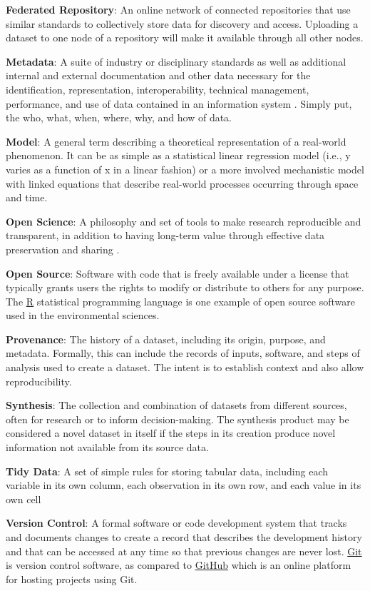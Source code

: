 \documentclass[
]{book}
\begin{document}
\textbf{Federated Repository}: An online network of connected repositories that use similar standards to collectively store data for discovery and access. Uploading a dataset to one node of a repository will make it available through all other nodes.

\textbf{Metadata}: A suite of industry or disciplinary standards as well as additional internal and external documentation and other data necessary for the identification, representation, interoperability, technical management, performance, and use of data contained in an information system \citep{Gilliland16}. Simply put, the who, what, when, where, why, and how of data.

\textbf{Model}: A general term describing a theoretical representation of a real-world phenomenon. It can be as simple as a statistical linear regression model (i.e., y varies as a function of x in a linear fashion) or a more involved mechanistic model with linked equations that describe real-world processes occurring through space and time.

\textbf{Open Science}: A philosophy and set of tools to make research reproducible and transparent, in addition to having long-term value through effective data preservation and sharing \citep{Beck20}.

\textbf{Open Source}: Software with code that is freely available under a license that typically grants users the rights to modify or distribute to others for any purpose. The \href{https://cran.r-project.org/}{R} statistical programming language is one example of open source software used in the environmental sciences.

\textbf{Provenance}: The history of a dataset, including its origin, purpose, and metadata. Formally, this can include the records of inputs, software, and steps of analysis used to create a dataset. The intent is to establish context and also allow reproducibility.

\textbf{Synthesis}: The collection and combination of datasets from different sources, often for research or to inform decision-making. The synthesis product may be considered a novel dataset in itself if the steps in its creation produce novel information not available from its source data.

\textbf{Tidy Data}: A set of simple rules for storing tabular data, including each variable in its own column, each observation in its own row, and each value in its own cell \citep{Wickham14c}

\textbf{Version Control}: A formal software or code development system that tracks and documents changes to create a record that describes the development history and that can be accessed at any time so that previous changes are never lost. \href{https://git-scm.com/}{Git} is version control software, as compared to \href{https://github.com/}{GitHub} which is an online platform for hosting projects using Git.
\end{document}
